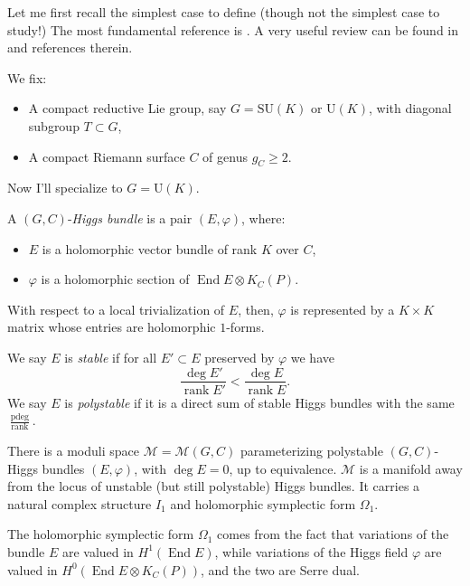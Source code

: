 \documentclass[12pt,letterpaper,reqno]{article}
\numberwithin{equation}{section}
\newcommand{\cM}{\ensuremath{\mathcal M}}
\newcommand{\ti}[1]{\textit{#1}}
\DeclareMathOperator{\End}{End}
\DeclareMathOperator{\rank}{rank}
\DeclareMathOperator{\pdeg}{pdeg}
\newcommand{\SU}{\mathrm{SU}}
\newcommand{\U}{\mathrm{U}}
\begin{document}
Let me first recall the simplest case to define (though not the simplest
case to study!) The most fundamental reference is \cite{MR89a:32021}.
A very useful review can be found in
\cite{Wentworth2014} and references therein.

We fix:
\begin{itemize}
  \item A compact reductive Lie group, say $G = \SU(K)$ or $\U(K)$, with diagonal subgroup $T \subset G$,
  \item A compact Riemann surface $C$ of genus $g_C \ge 2$.
\end{itemize}

Now I'll specialize to $G = \U(K)$.
\begin{defn}[Higgs bundles for $G = \U(K)$] \label{def:parabolic-higgs}
A $(G, C)$-\ti{Higgs bundle} is a pair $(E, \varphi)$, where:
\begin{itemize}
  \item $E$ is a holomorphic vector bundle of rank $K$ over $C$,
  \item $\varphi$ is a holomorphic section of $\End E \otimes K_C(P)$.
\end{itemize}
\end{defn}
With respect to a local trivialization of $E$, then, $\varphi$ is represented
by a $K \times K$ matrix whose entries are holomorphic $1$-forms.

\begin{defn}
We say $E$ is \ti{stable} if for all $E' \subset E$ preserved
by $\varphi$ we have
\begin{equation}
  \frac{\deg E'}{\rank E'} < \frac{\deg E}{\rank E}.
\end{equation}
We say $E$ is \ti{polystable} if it is a direct sum of
stable Higgs bundles with the same $\frac{\pdeg}{\rank}$.
\end{defn}

\begin{prop}
There is a moduli space $\cM = \cM(G,C)$ parameterizing
polystable $(G,C)$-Higgs bundles $(E,\varphi)$, with $\deg E = 0$, 
up to equivalence. 
$\cM$ is a manifold away
from the locus of unstable (but still polystable) Higgs bundles.
It carries a natural complex structure $I_1$ and holomorphic symplectic form $\Omega_1$.
\end{prop}

The holomorphic symplectic form $\Omega_1$ comes from the fact 
that variations of the bundle $E$ are valued in $H^1(\End E)$,
while variations of the Higgs field $\varphi$ are
valued in $H^0(\End E \otimes K_C(P))$,
and the two are Serre dual.
\end{document}
